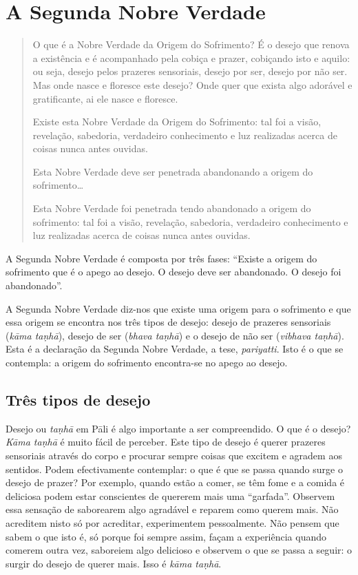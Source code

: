 \chapter{A Segunda Nobre Verdade}

\begin{quote}
  O que é a Nobre Verdade da Origem do Sofrimento? É o desejo que renova a
  existência e é acompanhado pela cobiça e prazer, cobiçando isto e aquilo: ou
  seja, desejo pelos prazeres sensoriais, desejo por ser, desejo por não ser.
  Mas onde nasce e floresce este desejo? Onde quer que exista algo adorável e
  gratificante, ai ele nasce e floresce.

  Existe esta Nobre Verdade da Origem do Sofrimento: tal foi a visão, revelação,
  sabedoria, verdadeiro conhecimento e luz realizadas acerca de coisas nunca
  antes ouvidas.

  Esta Nobre Verdade deve ser penetrada abandonando a origem do
  sofrimento\ldots{}

  Esta Nobre Verdade foi penetrada tendo abandonado a origem do sofrimento: tal
  foi a visão, revelação, sabedoria, verdadeiro conhecimento e luz realizadas
  acerca de coisas nunca antes ouvidas.

\end{quote}

A Segunda Nobre Verdade é composta por três fases: “Existe a origem do
sofrimento que é o apego ao desejo. O desejo deve ser abandonado. O desejo foi
abandonado”.

A Segunda Nobre Verdade diz-nos que existe uma origem para o sofrimento e que
essa origem se encontra nos três tipos de desejo: desejo de prazeres sensoriais
(\emph{kāma taṇhā}), desejo de ser (\emph{bhava taṇhā}) e o desejo de não ser
(\emph{vibhava taṇhā}). Esta é a declaração da Segunda Nobre Verdade, a tese,
\emph{pariyatti}. Isto é o que se contempla: a origem do sofrimento encontra-se
no apego ao desejo.

\section{Três tipos de desejo}

Desejo ou \emph{taṇhā} em Pāli é algo importante a ser compreendido. O que é o
desejo? \emph{Kāma taṇhā} é muito fácil de perceber. Este tipo de desejo é
querer prazeres sensoriais através do corpo e procurar sempre coisas que excitem
e agradem aos sentidos. Podem efectivamente contemplar: o que é que se passa
quando surge o desejo de prazer? Por exemplo, quando estão a comer, se têm fome
e a comida é deliciosa podem estar conscientes de quererem mais uma “garfada”.
Observem essa sensação de saborearem algo agradável e reparem como querem mais.
Não acreditem nisto só por acreditar, experimentem pessoalmente. Não pensem que
sabem o que isto é, só porque foi sempre assim, façam a experiência quando
comerem outra vez, saboreiem algo delicioso e observem o que se passa a seguir:
o surgir do desejo de querer mais. Isso é \emph{kāma taṇhā}.

